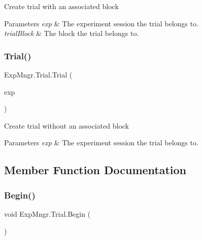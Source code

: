 Create trial with an associated block 


\begin{DoxyParams}{Parameters}
{\em exp} & The experiment session the trial belongs to.\\
\hline
{\em trial\+Block} & The block the trial belongs to.\\
\hline
\end{DoxyParams}
\mbox{\label{class_exp_mngr_1_1_trial_a7d8023ebd830604a202875026a47187b}} 
\subsubsection{\texorpdfstring{Trial()}{Trial()}\hspace{0.1cm}{\footnotesize\ttfamily [2/2]}}
{\footnotesize\ttfamily Exp\+Mngr.\+Trial.\+Trial (\begin{DoxyParamCaption}\item[{\hyperlink{class_exp_mngr_1_1_experiment_session}{Experiment\+Session}}]{exp }\end{DoxyParamCaption})}



Create trial without an associated block 


\begin{DoxyParams}{Parameters}
{\em exp} & The experiment session the trial belongs to.\\
\hline
\end{DoxyParams}


\subsection{Member Function Documentation}
\mbox{\label{class_exp_mngr_1_1_trial_a4281bab345d041e995132d16462b056e}} 
\subsubsection{\texorpdfstring{Begin()}{Begin()}}
{\footnotesize\ttfamily void Exp\+Mngr.\+Trial.\+Begin (\begin{DoxyParamCaption}{ }\end{DoxyParamCaption})}



